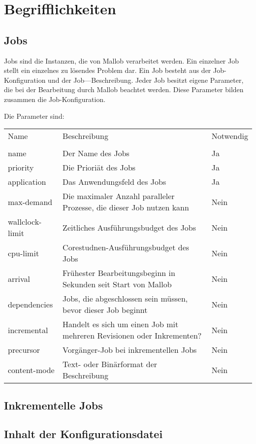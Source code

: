 \section{Begrifflichkeiten}
\subsection{Jobs}

Jobs sind die Instanzen, die von Mallob verarbeitet werden. Ein einzelner Job stellt ein einzelnes zu lösendes Problem dar. Ein Job besteht aus der Job-Konfiguration und der Job—Beschreibung.
Jeder Job besitzt eigene Parameter, die bei der Bearbeitung durch Mallob beachtet werden. 
Diese Parameter bilden zusammen die Job-Konfiguration.

Die Parameter sind:
\begin{tabular}{lL{0.6\textwidth}l}
        Name & Beschreibung & Notwendig\\
        \\
        name & Der Name des Jobs & Ja\\
        priority & Die Prioriät des Jobs & Ja\\
        application & Das Anwendungsfeld des Jobs & Ja\\ 
        max-demand & Die maximaler Anzahl paralleler Prozesse, die dieser Job nutzen kann & Nein\\
        wallclock-limit & Zeitliches Ausführungsbudget des Jobs & Nein\\
        cpu-limit & Corestudnen-Ausführungsbudget des Jobs & Nein\\
        arrival & Frühester Bearbeitungsbeginn in Sekunden seit Start von Mallob & Nein\\
        dependencies & Jobs, die abgeschlossen sein müssen, bevor dieser Job beginnt & Nein\\
        incremental & Handelt es sich um einen Job mit mehreren Revisionen oder Inkrementen? &  Nein\\
        precursor & Vorgänger-Job bei inkrementellen Jobs & Nein\\
        content-mode & Text- oder Binärformat der Beschreibung & Nein\\
    \end{tabular} 



\subsection{Inkrementelle Jobs}

\subsection{Inhalt der Konfigurationsdatei}